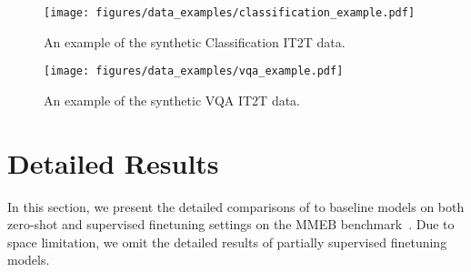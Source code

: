 \begin{figure*}[p]
	\centering
	\texttt{[image: figures/data\_examples/classification\_example.pdf]}%
	\caption{An example of the synthetic Classification IT2T data.}
	\vspace{-2ex}
	\label{fig:classification_example}
\end{figure*}


\begin{figure*}[p]
	\centering 
	\texttt{[image: figures/data\_examples/vqa\_example.pdf]}%
	\caption{An example of the synthetic VQA IT2T data.}
	\vspace{-2ex}
	\label{fig:vqa_example}
\end{figure*}

\afterpage{\clearpage}

\section{Detailed Results}

In this section, we present the detailed comparisons of \ours{} to baseline models on both zero-shot and supervised finetuning settings on the MMEB benchmark~\cite{MMEB}.
Due to space limitation, we omit the detailed results of partially supervised finetuning models.

